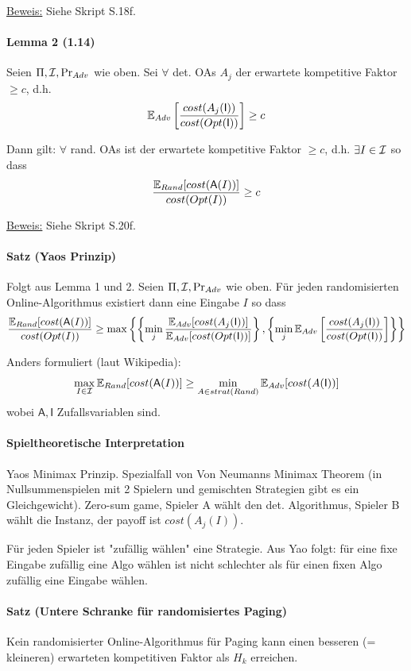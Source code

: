 \underline{Beweis:} Siehe Skript S.18f.

\paragraph{Lemma 2 (1.14)}
Seien $\Pi, \mathcal{I}, \Pr_{Adv}$ wie oben.
Sei $\forall$ det. OAs $A_j$ der erwartete kompetitive Faktor $\geq c$, d.h.
$$ \mathbb{E}_{Adv} \left[ \dfrac{cost(A_j(\mathsf{I}))}{cost(Opt(\mathsf{I}))} \right] \geq c $$

Dann gilt:
$\forall$ rand. OAs ist der erwartete kompetitive Faktor $\geq c$, d.h. $\exists I \in \mathcal{I}$ so dass
$$ \dfrac{ \mathbb{E}_{Rand} [ cost(\mathsf{A}(I)) ]}{cost(Opt(I))} \geq c $$

\underline{Beweis:} Siehe Skript S.20f.

\paragraph{Satz (Yaos Prinzip)}
Folgt aus Lemma 1 und 2.
Seien $\Pi, \mathcal{I}, \Pr_{Adv}$ wie oben.
Für jeden randomisierten Online-Algorithmus existiert dann eine Eingabe $I$ so dass
$$
\dfrac{\mathbb{E}_{Rand}[cost(\mathsf{A}(I))]}{cost(Opt(I))}
    \geq \max \left\lbrace
    \left\lbrace \min_j \dfrac{\mathbb{E}_{Adv}[cost(A_j(\mathsf{I}))]}{\mathbb{E}_{Adv}[cost(Opt(\mathsf{I}))]} \right\rbrace,
    \left\lbrace \min_j \mathbb{E}_{Adv} \left[ \dfrac{cost(A_j(\mathsf{I}))}{cost(Opt(\mathsf{I}))} \right] \right\rbrace
    \right\rbrace
$$

Anders formuliert (laut Wikipedia):
$$ \max_{I \in \mathcal{I}} \mathbb{E}_{Rand}[cost(\mathsf{A}(I))] \geq \min_{A \in strat(Rand)} \mathbb{E}_{Adv}[cost(A(\mathsf{I} ))] $$
wobei $\mathsf{A}, \mathsf{I}$ Zufallsvariablen sind.

\paragraph{Spieltheoretische Interpretation}
Yaos Minimax Prinzip. Spezialfall von Von Neumanns Minimax Theorem (in Nullsummenspielen mit
2 Spielern und gemischten Strategien gibt es ein Gleichgewicht).
Zero-sum game, Spieler A wählt den det. Algorithmus, Spieler B wählt die Instanz, der payoff ist $cost(A_j(I))$.

Für jeden Spieler ist "zufällig wählen" eine Strategie.
Aus Yao folgt: für eine fixe Eingabe zufällig eine Algo wählen ist nicht schlechter
als für einen fixen Algo zufällig eine Eingabe wählen.

\paragraph{Satz (Untere Schranke für randomisiertes Paging)}
Kein randomisierter Online-Algorithmus für Paging kann einen besseren (= kleineren) erwarteten
kompetitiven Faktor als $H_k$ erreichen.

